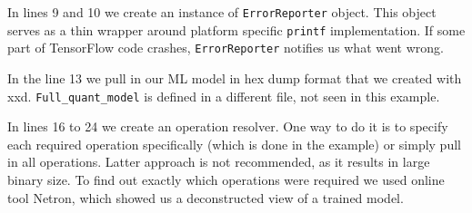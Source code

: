 In lines 9 and 10 we create an instance of \verb|ErrorReporter| object.
This object serves as a thin wrapper around platform specific \verb|printf| implementation.
If some part of TensorFlow code crashes, \verb|ErrorReporter| notifies us what went wrong.

In the line 13 we pull in our ML model in hex dump format that we created with xxd.
\verb|Full_quant_model| is defined in a different file, not seen in this example.

In lines 16 to 24 we create an operation resolver.
One way to do it is to specify each required operation specifically (which is done in the example) or simply pull in all operations.
Latter approach is not recommended, as it results in large binary size.
To find out exactly which operations were required we used online tool Netron\cite{netron}, which showed us a deconstructed view of a trained model.

